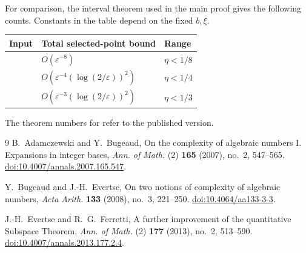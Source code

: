 \documentclass[11pt]{article}
\numberwithin{equation}{section}
\theoremstyle{remark}
\newcommand{\eps}{\varepsilon}
\begin{document}
For comparison, the interval theorem used in the main proof gives
the following counts. Constants in the table depend on the fixed
$b,\xi$.
\begin{center}
\small
\begin{tabular}{@{}lll@{}}
\toprule
Input & Total selected-point bound & Range\\
\midrule
\cite[Theorem~5.1]{BE08}
 & $O(\eps^{-8})$ & $\eta<1/8$\\
\cite[Theorem~2.1]{EF13}
 & $O(\eps^{-4}(\log(2/\eps))^2)$ & $\eta<1/4$\\
\cite[Theorem~2.3]{EF13}
 & $O(\eps^{-3}(\log(2/\eps))^2)$ & $\eta<1/3$\\
\bottomrule
\end{tabular}
\end{center}
The theorem numbers for \cite{EF13} refer to the published version.

\begin{thebibliography}{9}
B.~Adamczewski and Y.~Bugeaud,
On the complexity of algebraic numbers I. Expansions in integer bases,
\emph{Ann. of Math.} (2) \textbf{165} (2007), no.~2, 547--565.
\href{https://doi.org/10.4007/annals.2007.165.547}
     {doi:10.4007/annals.2007.165.547}.

Y.~Bugeaud and J.-H.~Evertse,
On two notions of complexity of algebraic numbers,
\emph{Acta Arith.} \textbf{133} (2008), no.~3, 221--250.
\href{https://doi.org/10.4064/aa133-3-3}
     {doi:10.4064/aa133-3-3}.

J.-H.~Evertse and R.~G.~Ferretti,
A further improvement of the quantitative Subspace Theorem,
\emph{Ann. of Math.} (2) \textbf{177} (2013), no.~2, 513--590.
\href{https://doi.org/10.4007/annals.2013.177.2.4}
     {doi:10.4007/annals.2013.177.2.4}.
\end{thebibliography}
\end{document}
